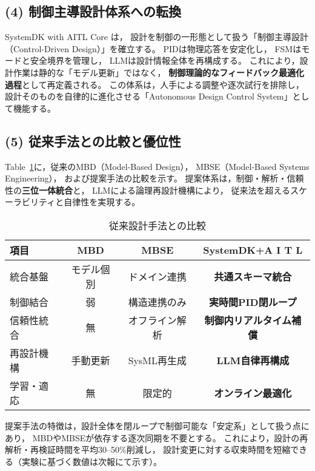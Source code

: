 \subsection{(4) 制御主導設計体系への転換}
SystemDK with AITL Core は，
設計を制御の一形態として扱う「制御主導設計（Control-Driven Design）」を確立する。
PIDは物理応答を安定化し，
FSMはモードと安全境界を管理し，
LLMは設計情報全体を再構成する。
これにより，設計作業は静的な「モデル更新」ではなく，
\textbf{制御理論的なフィードバック最適化過程}として再定義される。
この体系は，人手による調整や逐次試行を排除し，
設計そのものを自律的に進化させる「Autonomous Design Control System」として機能する。

\subsection{(5) 従来手法との比較と優位性}
Table~\ref{tab:compare}に，従来のMBD（Model-Based Design），
MBSE（Model-Based Systems Engineering），
および提案手法の比較を示す。
提案体系は，制御・解析・信頼性の\textbf{三位一体統合}と，
LLMによる論理再設計機構により，
従来法を超えるスケーラビリティと自律性を実現する。

\begin{table}[t]
\caption{従来設計手法との比較}
\label{tab:compare}
\centering
\begin{tabular}{lccc}
\toprule
項目 & MBD & MBSE & SystemDK+A I T L \\
\midrule
統合基盤 & モデル個別 & ドメイン連携 & \textbf{共通スキーマ統合} \\
制御結合 & 弱 & 構造連携のみ & \textbf{実時間PID閉ループ} \\
信頼性統合 & 無 & オフライン解析 & \textbf{制御内リアルタイム補償} \\
再設計機構 & 手動更新 & SysML再生成 & \textbf{LLM自律再構成} \\
学習・適応 & 無 & 限定的 & \textbf{オンライン最適化} \\
\bottomrule
\end{tabular}
\end{table}

提案手法の特徴は，設計全体を閉ループで制御可能な「安定系」として扱う点にあり，
MBDやMBSEが依存する逐次同期を不要とする。
これにより，設計の再解析・再検証時間を平均30–50\%削減し，
設計変更に対する収束時間を短縮できる（実験に基づく数値は次報にて示す）。

